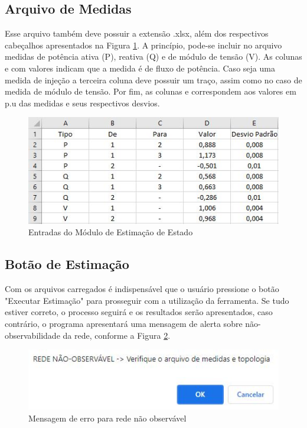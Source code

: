\documentclass{article}
\begin{document}
\subsection{Arquivo de Medidas}
Esse arquivo também deve possuir a extensão .xlsx, além dos respectivos cabeçalhos apresentados na Figura \ref{fig:arq_meds}. A princípio, pode-se incluir no arquivo medidas de potência ativa (P), reativa (Q) e de módulo de tensão (V).
As colunas  e  com valores indicam que a medida é de fluxo de potência. 
Caso seja uma medida de injeção  a terceira coluna deve possuir um traço, assim como no caso de medida de módulo de tensão. Por fim, as colunas  e  correspondem aos valores em p.u das medidas e seus respectivos desvios.   
\begin{figure}[H]
    \centering
    \includegraphics[scale=.7]{Imagens/Foto_Arquivo_de_Medidas.JPG}
    \caption{Entradas do Módulo de Estimação de Estado}
    \label{fig:arq_meds}
\end{figure}

\subsection{Botão de Estimação}
Com os arquivos carregados é indispensável que o usuário pressione o botão "Executar Estimação" para prosseguir com a utilização da ferramenta. Se tudo estiver correto, o processo seguirá e os resultados serão apresentados, caso contrário, o programa apresentará uma mensagem de alerta sobre não-observabilidade da rede, conforme a Figura \ref{fig:Pop_obs}. 

\begin{figure}[H]
    \centering
    \includegraphics[scale = .7]{Imagens/Pop-up_Observabilidade.JPG}
    \caption{Mensagem de erro para rede não observável}
    \label{fig:Pop_obs}
\end{figure}
\end{document}
